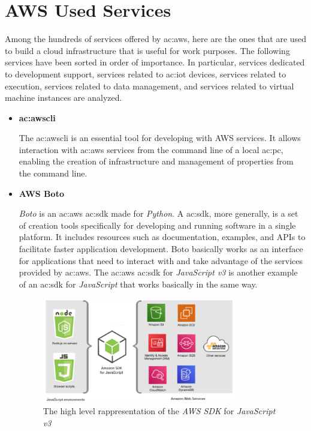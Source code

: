 \section{AWS Used Services}
Among the hundreds of services offered by \gls{ac:aws}, here are the ones that are used to build a cloud infrastructure that is useful for work purposes. The following services have been sorted in order of importance. In particular, services dedicated to development support, services related to \gls{ac:iot} devices, services related to execution, services related to data management, and services related to virtual machine instances are analyzed.
\begin{itemize}
    \item[] \textbf{\gls{ac:awscli}} 
    
    The \gls{ac:awscli} is an essential tool for developing with AWS services. It allows interaction with \gls{ac:aws} services from the command line of a local \gls{ac:pc}, enabling the creation of infrastructure and management of properties from the command line.
    
    \item[] \textbf{AWS Boto} 
    
    \textit{Boto} is an \gls{ac:aws} \gls{ac:sdk} made for \textit{Python}. A \gls{ac:sdk}, more generally, is a set of creation tools specifically for developing and running software in a single platform. It includes resources such as documentation, examples, and APIs to facilitate faster application development. Boto basically works as an interface for applications that need to interact with and take advantage of the services provided by \gls{ac:aws}. The \gls{ac:aws} \gls{ac:sdk} for \textit{JavaScript v3} is another example of an \gls{ac:sdk} for \textit{JavaScript} that works basically in the same way.
    \begin{figure}[h]  %
        \centering
        \includegraphics[width=0.8\textwidth]{images/AWSSDK.png}  %
        \caption{The high level rappresentation of the \textit{AWS SDK} for \textit{JavaScript v3} \cite{AWSSDK}}
        \label{fig:AWSSDK}
    \end{figure}
    

\end{itemize}
